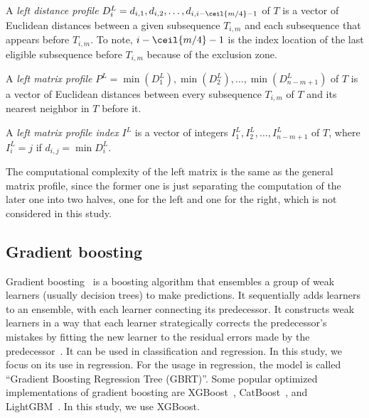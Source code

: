 \begin{definition}
    A \textit{left distance profile} $D_i^L = d_{i, 1}, d_{i, 2}, \dots,\allowbreak d_{i, i - \ceil{m/4} -1}$ of $T$ is a vector of Euclidean distances between a given subsequence $T_{i, m}$ and each subsequence that appears before $T_{i, m}$.
    To note, $i - \ceil{m/4} - 1$ is the index location of the last eligible subsequence before $T_{i, m}$ because of the exclusion zone.
\end{definition}

\begin{definition}
    A \textit{left matrix profile} $P^L = \min(D_1^L), \min(D_2^L), \allowbreak  \dots, \min(D_{n-m+1}^L)$ of $T$ is a vector of Euclidean distances between every subsequence $T_{i, m}$ of $T$ and its nearest neighbor in $T$ before it.
\end{definition}

\begin{definition}
    A \textit{left matrix profile index} $I^L$ is a vector of integers $I_1^L, I_2^L, \dots, I_{n-m+1}^L$ of $T$, where $I_i^L = j$ if $d_{i, j} = \min{D_i^L}$.
\end{definition}

The computational complexity of the left matrix is the same as the general matrix profile, since the former one is just separating the computation of the later one into two halves, one for the left and one for the right, which is not considered in this study.

\subsection{Gradient boosting} %

Gradient boosting~\cite{friedman2001greedy} is a boosting algorithm that ensembles a group of weak learners (usually decision trees) to make predictions.
It sequentially adds learners to an ensemble, with each learner connecting its predecessor.
It constructs weak learners in a way that each learner strategically corrects the predecessor's mistakes by fitting the new learner to the residual errors made by the predecessor~\cite{serrano2021grokking, geron2025handson}.
It can be used in classification and regression.
In this study, we focus on its use in regression.
For the usage in regression, the model is called ``Gradient Boosting Regression Tree (GBRT)''.
Some popular optimized implementations of gradient boosting are XGBoost~\cite{chen2016xgboost}, CatBoost~\cite{dorogush2017catboost}, and LightGBM~\cite{ke2017lightgbm}.
In this study, we use XGBoost.